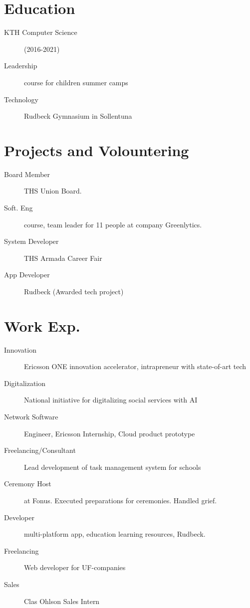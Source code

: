 \documentclass[margin,line,a4paper]{resume}
\begin{document}
\begin{resume}
\section{\mysidestyle Education}\vspace{1mm}
    \begin{description}
        \item[KTH Computer Science] (2016-2021)
         \item[Leadership] course for children summer camps
        \item[Technology] Rudbeck Gymnasium in Sollentuna
    \end{description} 

\section{\mysidestyle Projects and Volountering}\vspace{1mm}
\begin{description}
    \item[Board Member] THS Union Board. 
    \item[Soft. Eng] course, team leader for 11 people at company Greenlytics.   
     \item[System Developer] THS Armada Career Fair
    \item[App Developer] Rudbeck (Awarded tech project) 

\end{description}  
  
\section{\mysidestyle Work Exp.}\vspace{1mm}
\begin{description}
    \item[Innovation] Ericsson ONE innovation accelerator, intrapreneur with state-of-art tech
    \item[Digitalization] National initiative for digitalizing social services with AI
    \item[Network Software] Engineer, Ericsson Internship, Cloud product prototype
    \item[Freelancing/Consultant] Lead development of task management system for schools
    \item[Ceremony Host] at Fonus. Executed preparations for ceremonies. Handled grief.
    \item[Developer] multi-platform app, education learning resources, Rudbeck.
    \item[Freelancing] Web developer for UF-companies
    \item[Sales] Clas Ohlson Sales Intern
\end{description}


\end{resume}
\end{document}
